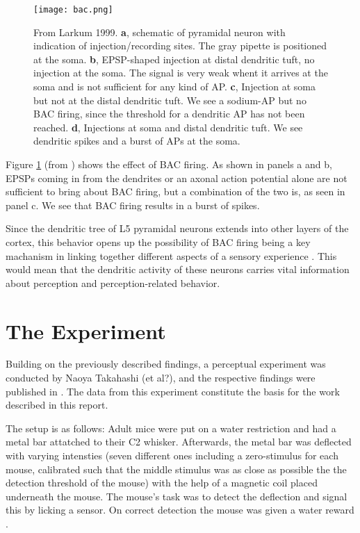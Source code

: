 \documentclass[
10pt, %
a4paper, %
oneside, %
headinclude,footinclude, %
BCOR5mm, %
]{scrartcl}
\begin{document}
\begin{figure}[tb]
\centering 
\texttt{[image: bac.png]} 
\caption[BAC Firing]{From Larkum 1999. \textbf{a}, schematic of pyramidal neuron with indication of injection/recording sites. The gray pipette is positioned at the soma. \textbf{b}, EPSP-shaped injection at distal dendritic tuft, no injection at the soma. The signal is very weak whent it arrives at the soma and is not sufficient for any kind of AP. \textbf{c}, Injection at soma but not at the distal dendritic tuft. We see a sodium-AP but no BAC firing, since the threshold for a dendritic AP has not been reached. \textbf{d},  Injections at soma and distal dendritic tuft. We see dendritic spikes and a burst of APs at the soma.} %
\label{fig:bac} 
\end{figure}

Figure \ref{fig:bac} (from \cite{Larkum1999}) shows the effect of BAC firing. As shown in panels a and b, EPSPs coming in from the dendrites or an axonal action potential alone are not sufficient to bring about BAC firing, but a combination of the two is, as seen in panel c. We see that BAC firing results in a burst of spikes.

Since the dendritic tree of L5 pyramidal neurons extends into other layers of the cortex, this behavior opens up the possibility of BAC firing being a key machanism in linking together different aspects of a sensory experience \cite{Larkum1999}. This would mean that the dendritic activity of these neurons carries vital information about perception and perception-related behavior.


\section{The Experiment}
Building on the previously described findings, a perceptual experiment was conducted by Naoya Takahashi (et al?), and the respective findings were published in \cite{Takahashi2016}. The data from this experiment constitute the basis for the work described in this report.

The setup is as follows: Adult mice were put on a water restriction and had a metal bar attatched to their C2 whisker. Afterwards, the metal bar was deflected with varying intensties (seven different ones including a zero-stimulus for each mouse, calibrated such that the middle stimulus was as close as possible the the detection threshold of the mouse) with the help of a magnetic coil placed underneath the mouse. The mouse's task was to detect the deflection and signal this by licking a sensor. On correct detection the mouse was given a water reward \cite{Takahashi2016}.
\end{document}
